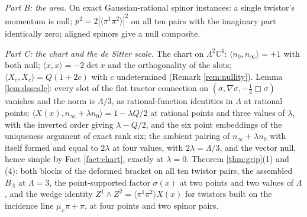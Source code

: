 \documentclass[11pt]{article}
\theoremstyle{definition}
\newcommand{\C}{\mathbb{C}}
\newcommand{\ip}[2]{\langle #1, #2\rangle}
\newcommand{\br}[1]{\langle #1\rangle}
\begin{document}
\emph{Part B: the area.} On exact Gaussian-rational spinor instances: a single twistor's momentum is null; $p^{2} = 2|\br{\pi^{1}\pi^{2}}|^{2}$ on all ten pairs with the imaginary part identically zero; aligned spinors give a null composite.

\emph{Part C: the chart and the de Sitter scale.} The chart on $\Lambda^{2}\C^{4}$: $\ip{n_{0}}{n_{\infty}} = +1$ with both null; $\ip{x}{x} = -2\det x$ and the orthogonality of the slots; $\ip{X_{c}}{X_{c}} = Q(1+2c)$ with $c$ undetermined (Remark \ref{rem:nullity}). Lemma \ref{lem:dsscale}: every slot of the flat tractor connection on $(\sigma, \nabla\sigma, -\tfrac14\Box\sigma)$ vanishes and the norm is $\Lambda/3$, as rational-function identities in $\Lambda$ at rational points; $\ip{X(x)}{n_{\infty} + \lambda n_{0}} = 1 - \lambda Q/2$ at rational points and three values of $\lambda$, with the inverted order giving $\lambda - Q/2$, and the six point embeddings of the uniqueness argument of exact rank six; the ambient pairing of $n_{\infty} + \lambda n_{0}$ with itself formed and equal to $2\lambda$ at four values, with $2\lambda = \Lambda/3$, and the vector null, hence simple by Fact \ref{fact:chart}, exactly at $\lambda = 0$. Theorem \ref{thm:grip}(1) and (4): both blocks of the deformed bracket on all ten twistor pairs, the assembled $B_{\Lambda}$ at $\Lambda = 3$, the point-supported factor $\sigma(x)$ at two points and two values of $\Lambda$, and the wedge identity $Z^{1}\wedge Z^{2} = \br{\pi^{1}\pi^{2}}X(x)$ for twistors built on the incidence line $\mu_{x}\pi + \pi$, at four points and two spinor pairs.
\end{document}
